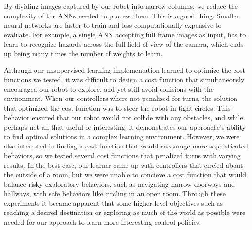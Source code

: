 \documentclass{article}
\begin{document}
		By dividing images captured by our robot into narrow columns, we reduce the complexity of the ANNs needed to process them.  This is a good thing. Smaller neural networks are faster to train and less computationally expensive to evaluate.  For example, a single ANN accepting full frame images as input, has to learn to recognize hazards across the full field of view of the camera, which ends up being many times the number of weights to learn.
		
		Although our unsupervised learning implementation learned to optimize the cost functions we tested, it was difficult to design a cost function that simultaneously encouraged our robot to explore, and yet still avoid collisions with the environment.  When our controllers where not penalized for turns, the solution that optimized the cost function was to steer the robot in tight circles.  This behavior ensured that our robot would not collide with any obstacles, and while perhaps not all that useful or interesting, it demonstrates our approache's ability to find optimal solutions in a complex learning environment.  However, we were also interested in finding a cost function that would encourage more sophisticated behaviors, so we tested several cost functions that penalized turns with varying results.  In the best case, our learner came up with controllers that circled about the outside of a room, but we were unable to concieve a cost function that would balance risky exploratory behaviors, such as navigating narrow doorways and hallways, with safe behaviors like circling in an open room.  Through these experiments it became apparent that some higher level objectives such as reaching a desired destination or exploring as much of the world as possible were needed for our approach to learn more interesting control policies.
\end{document}
